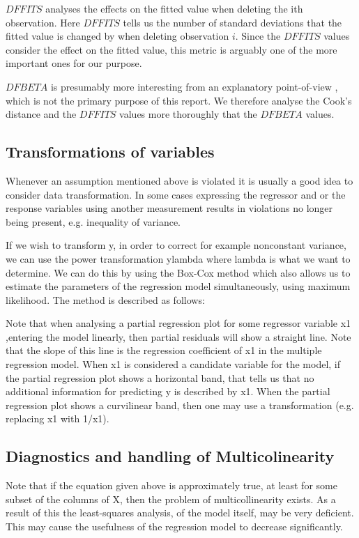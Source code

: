 \documentclass[11pt]{article}
\begin{document}
\(DFFITS\) analyses the effects on the fitted value when deleting the ith observation. Here \(DFFITS\) tells us
the number of standard deviations that the fitted value is changed by when deleting observation \(i\). Since 
the \(DFFITS\) values consider the effect on the fitted value, this metric is arguably one of the more important 
ones for our purpose.

\(DFBETA\) is presumably more interesting from an explanatory point-of-view \cite{22286}, which is not the
primary purpose of this report. We therefore analyse the Cook's distance and the \(DFFITS\) values more
thoroughly that the \(DFBETA\) values.

\subsection{Transformations of variables}
\label{sec:org2abde0e}

Whenever an assumption mentioned above is violated it is usually a good idea to consider data transformation. 
In some cases expressing the regressor and or the response variables using another measurement results in 
violations no longer being present, e.g. inequality of variance. 

If we wish to transform y, in order to correct for example nonconstant variance, we can use the power
transformation ylambda where lambda is what we want to determine. We can do this by using the Box-Cox method
which also allows us to estimate the parameters of the regression model simultaneously, using maximum likelihood.
The method is described as follows:

Note that when analysing a partial regression plot for some regressor variable x1 ,entering the model linearly, 
then partial residuals will show a straight line. Note that the slope of this line is the regression coefficient 
of x1 in the multiple regression model. When x1 is considered a candidate variable for the model, if the partial
regression plot shows a horizontal band, that tells us that no additional information for predicting y is 
described by x1. When the partial regression plot shows a curvilinear band, then one may use a transformation 
(e.g. replacing x1 with 1/x1).

\subsection{Diagnostics and handling of Multicolinearity}
\label{sec:org804976d}

Note that if the equation given above is approximately true, at least for some subset of the columns of X,
then the problem of multicollinearity exists. As a result of this the least-squares analysis, of the model
itself, may be very deficient. This may cause the usefulness of the regression model to decrease significantly. 
\end{document}

